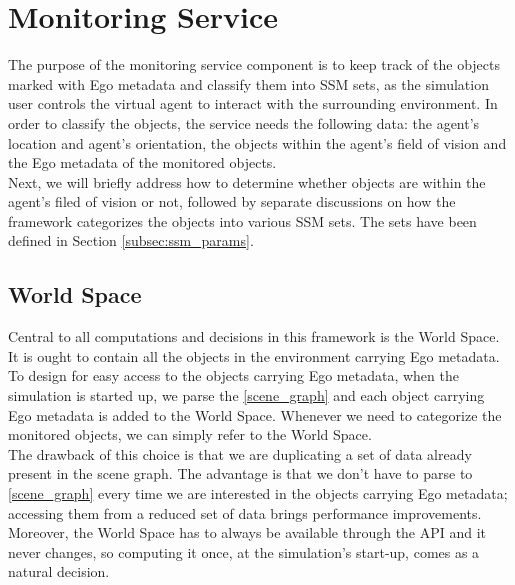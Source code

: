 \section{Monitoring Service} %
\label{sec:monitoring_service}
The purpose of the monitoring service component is to keep track of the objects marked with Ego metadata and classify them into SSM sets, as the simulation user controls the virtual agent to interact with the surrounding environment. In order to classify the objects, the service needs the following data: the agent's location and agent's orientation, the objects within the agent's field of vision and the Ego metadata of the monitored objects.\\

Next, we will briefly address how to determine whether objects are within the agent's filed of vision or not, followed by separate discussions on how the framework categorizes the objects into various SSM sets. The sets have been defined in Section \ref{subsec:ssm_params}.\\

\subsection{World Space}\label{subsec:world_space}
Central to all computations and decisions in this framework is the World Space. It is ought to contain all the objects in the environment carrying Ego metadata. To design for easy access to the objects carrying Ego metadata, when the simulation is started up, we parse the \ref{scene_graph} and each object carrying Ego metadata is added to the World Space. Whenever we need to categorize the monitored objects, we can simply refer to the World Space.\\

The drawback of this choice is that we are duplicating a set of data already present in the scene graph. The advantage is that we don't have to parse to \ref{scene_graph} every time we are interested in the objects carrying Ego metadata; accessing them from a reduced set of data brings performance improvements. Moreover, the World Space has to always be available through the API and it never changes, so computing it once, at the simulation's start-up, comes as a natural decision.

